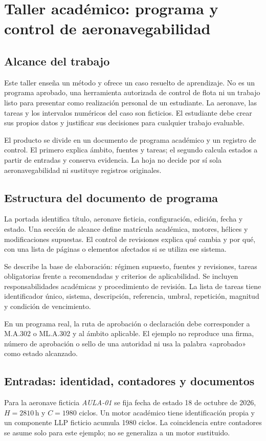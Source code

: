 \chapter{Taller académico: programa y control de aeronavegabilidad}\label{ch:25}
\section{Alcance del trabajo}
Este taller enseña un método y ofrece un caso resuelto de aprendizaje. No es un programa aprobado, una herramienta autorizada de control de flota ni un trabajo listo para presentar como realización personal de un estudiante. La aeronave, las tareas y los intervalos numéricos del caso son ficticios. El estudiante debe crear sus propios datos y justificar sus decisiones para cualquier trabajo evaluable.

El producto se divide en un documento de programa académico y un registro de control. El primero explica ámbito, fuentes y tareas; el segundo calcula estados a partir de entradas y conserva evidencia. La hoja no decide por sí sola aeronavegabilidad ni sustituye registros originales.
\section{Estructura del documento de programa}
La portada identifica título, aeronave ficticia, configuración, edición, fecha y estado. Una sección de alcance define matrícula académica, motores, hélices y modificaciones supuestas. El control de revisiones explica qué cambia y por qué, con una lista de páginas o elementos afectados si se utiliza ese sistema.

Se describe la base de elaboración: régimen supuesto, fuentes y revisiones, tareas obligatorias frente a recomendadas y criterios de aplicabilidad. Se incluyen responsabilidades académicas y procedimiento de revisión. La lista de tareas tiene identificador único, sistema, descripción, referencia, umbral, repetición, magnitud y condición de vencimiento.

En un programa real, la ruta de aprobación o declaración debe corresponder a M.A.302 o ML.A.302 y al ámbito aplicable. El ejemplo no reproduce una firma, número de aprobación o sello de una autoridad ni usa la palabra «aprobado» como estado alcanzado.
\section{Entradas: identidad, contadores y documentos}
Para la aeronave ficticia \textit{AULA-01} se fija fecha de estado 18 de octubre de 2026, $H=2810\,\mathrm h$ y $C=1980$ ciclos. Un motor académico tiene identificación propia y un componente LLP ficticio acumula 1980 ciclos. La coincidencia entre contadores se asume solo para este ejemplo; no se generaliza a un motor sustituido.

